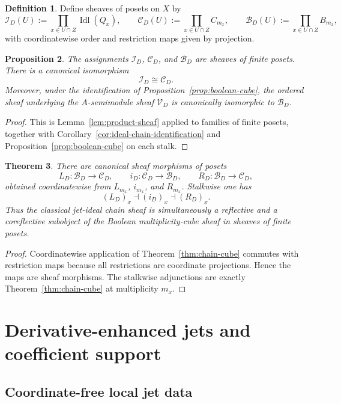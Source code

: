 \documentclass[11pt,a4paper]{article}
\numberwithin{equation}{section}
\newtheorem{theorem}{Theorem}[section]
\newtheorem{proposition}[theorem]{Proposition}
\theoremstyle{definition}
\newtheorem{definition}[theorem]{Definition}
\theoremstyle{remark}
\DeclareMathOperator{\Idl}{Idl}
\newcommand{\cV}{\mathcal V}
\newcommand{\cB}{\mathcal B}
\newcommand{\cI}{\mathcal I}
\newcommand{\cC}{\mathcal C}
\begin{document}
\begin{definition}
Define sheaves of posets on $X$ by
\[
\cI_D(U):=\prod_{x\in U\cap Z}\Idl(Q_x),
\qquad
\cC_D(U):=\prod_{x\in U\cap Z}C_{m_x},
\qquad
\cB_D(U):=\prod_{x\in U\cap Z}B_{m_x},
\]
with coordinatewise order and restriction maps given by projection.
\end{definition}

\begin{proposition}\label{prop:sheaves-posets}
The assignments $\cI_D$, $\cC_D$, and $\cB_D$ are sheaves of finite posets.  There is a canonical isomorphism
\[
\cI_D\cong\cC_D.
\]
Moreover, under the identification of Proposition~\ref{prop:boolean-cube}, the ordered sheaf underlying the $A$-semimodule sheaf $\cV_D$ is canonically isomorphic to $\cB_D$.
\end{proposition}

\begin{proof}
This is Lemma~\ref{lem:product-sheaf} applied to families of finite posets, together with Corollary~\ref{cor:ideal-chain-identification} and Proposition~\ref{prop:boolean-cube} on each stalk.
\end{proof}

\begin{theorem}\label{thm:sheafified-chain-cube}
There are canonical sheaf morphisms of posets
\[
L_D:\cB_D\to\cC_D,
\qquad
i_D:\cC_D\to\cB_D,
\qquad
R_D:\cB_D\to\cC_D,
\]
obtained coordinatewise from $L_{m_x}$, $i_{m_x}$, and $R_{m_x}$.  Stalkwise one has
\[
(L_D)_x\dashv (i_D)_x\dashv (R_D)_x.
\]
Thus the classical jet-ideal chain sheaf is simultaneously a reflective and a coreflective subobject of the Boolean multiplicity-cube sheaf in sheaves of finite posets.
\end{theorem}

\begin{proof}
Coordinatewise application of Theorem~\ref{thm:chain-cube} commutes with restriction maps because all restrictions are coordinate projections.  Hence the maps are sheaf morphisms.  The stalkwise adjunctions are exactly Theorem~\ref{thm:chain-cube} at multiplicity $m_x$.
\end{proof}

\section{Derivative-enhanced jets and coefficient support}

\subsection{Coordinate-free local jet data}
\end{document}

